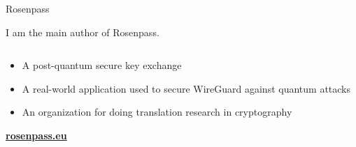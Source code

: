 \begin{frame}{Rosenpass}

  I am the main author of Rosenpass.

  \begin{columns}[fullwidth,c]

    \begin{column}{.7\linewidth}
      \begin{itemize}
        \item A post-quantum secure key exchange
        \item A real-world application used to secure WireGuard against quantum attacks
        \item An organization for doing translation research in cryptography
      \end{itemize}
      \bigskip
      \textbf{\url{rosenpass.eu}}
    \end{column}%
  \end{columns}
\end{frame}
